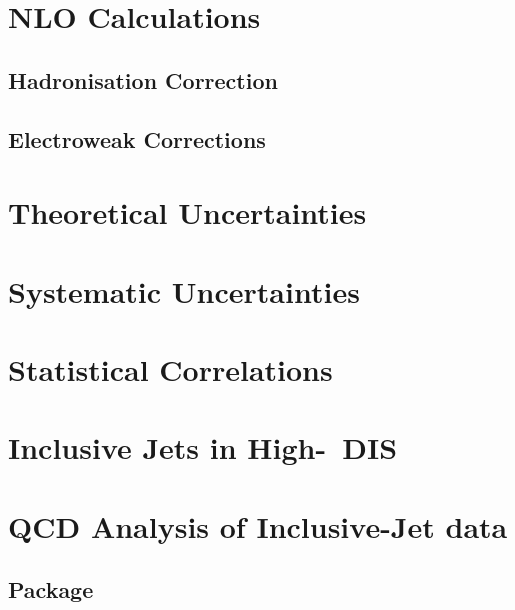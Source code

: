 \section{NLO Calculations}
\label{sec:nlopredictions}


\subsection{Hadronisation Correction}

% 
\subsection{Electroweak Corrections}


\section{Theoretical Uncertainties}
\label{sec:nlouncertainty}


\section{Systematic Uncertainties}
\label{subsec:systunc}


\section{Statistical Correlations}
\label{subsec:statcorel}


\section{Inclusive Jets in High-\qsq~DIS}
\label{sec:incljetsncdis}


\newpage
\section{QCD Analysis of Inclusive-Jet data}
\label{sec:aspdffit}


\subsection{\herafitter Package}
\label{subsec:herfitter}



